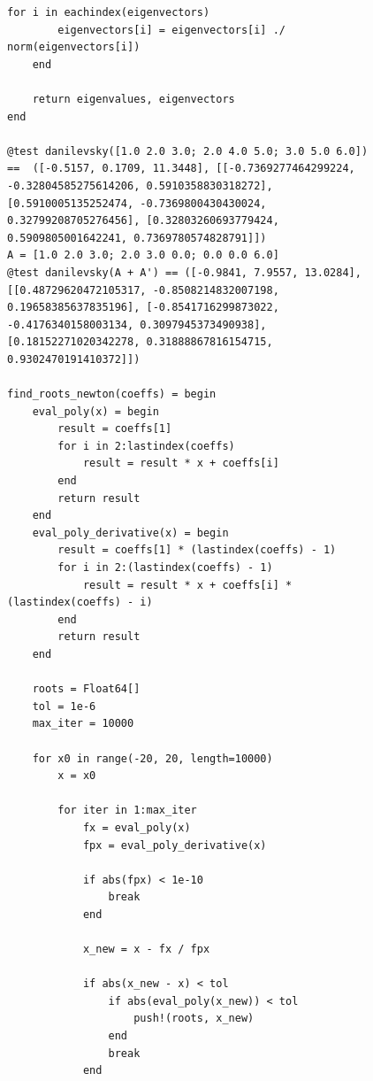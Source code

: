 \documentclass[a4paper, 14pt]{extarticle}
\begin{document}
\begin{figure}[!htb]
\begin{lstlisting}[language={},caption={Метод Крылова (продолжение)},label={lst:code4}]
    for i in eachindex(eigenvectors)
        eigenvectors[i] = eigenvectors[i] ./ norm(eigenvectors[i])
    end

    return eigenvalues, eigenvectors
end

@test danilevsky([1.0 2.0 3.0; 2.0 4.0 5.0; 3.0 5.0 6.0]) ==  ([-0.5157, 0.1709, 11.3448], [[-0.7369277464299224, -0.32804585275614206, 0.5910358830318272], [0.5910005135252474, -0.7369800430430024, 0.32799208705276456], [0.32803260693779424, 0.5909805001642241, 0.7369780574828791]])
A = [1.0 2.0 3.0; 2.0 3.0 0.0; 0.0 0.0 6.0]
@test danilevsky(A + A') == ([-0.9841, 7.9557, 13.0284], [[0.48729620472105317, -0.8508214832007198, 0.19658385637835196], [-0.8541716299873022, -0.4176340158003134, 0.3097945373490938], [0.18152271020342278, 0.31888867816154715, 0.9302470191410372]])

find_roots_newton(coeffs) = begin
    eval_poly(x) = begin
        result = coeffs[1]
        for i in 2:lastindex(coeffs)
            result = result * x + coeffs[i]
        end
        return result
    end
    eval_poly_derivative(x) = begin
        result = coeffs[1] * (lastindex(coeffs) - 1)
        for i in 2:(lastindex(coeffs) - 1)
            result = result * x + coeffs[i] * (lastindex(coeffs) - i)
        end
        return result
    end

    roots = Float64[]
    tol = 1e-6
    max_iter = 10000

    for x0 in range(-20, 20, length=10000)
        x = x0

        for iter in 1:max_iter
            fx = eval_poly(x)
            fpx = eval_poly_derivative(x)

            if abs(fpx) < 1e-10
                break
            end

            x_new = x - fx / fpx

            if abs(x_new - x) < tol
                if abs(eval_poly(x_new)) < tol
                    push!(roots, x_new)
                end
                break
            end
\end{lstlisting}
\end{figure}
\end{document}
